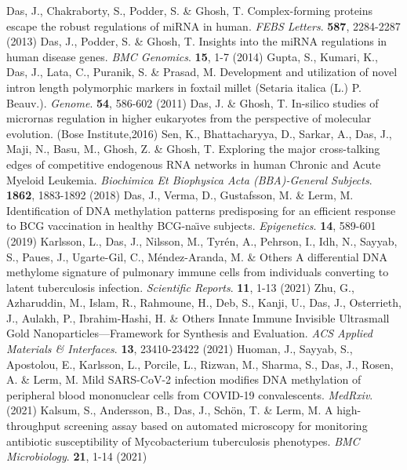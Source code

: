 Das, J., Chakraborty, S., Podder, S. \& Ghosh, T. Complex-forming proteins escape the robust regulations of miRNA in human. {\em FEBS Letters}. \textbf{587}, 2284-2287 (2013)
Das, J., Podder, S. \& Ghosh, T. Insights into the miRNA regulations in human disease genes. {\em BMC Genomics}. \textbf{15}, 1-7 (2014)
Gupta, S., Kumari, K., Das, J., Lata, C., Puranik, S. \& Prasad, M. Development and utilization of novel intron length polymorphic markers in foxtail millet (Setaria italica (L.) P. Beauv.). {\em Genome}. \textbf{54}, 586-602 (2011)
Das, J. \& Ghosh, T. In-silico studies of micrornas regulation in higher eukaryotes from the perspective of molecular evolution. (Bose Institute,2016)
Sen, K., Bhattacharyya, D., Sarkar, A., Das, J., Maji, N., Basu, M., Ghosh, Z. \& Ghosh, T. Exploring the major cross-talking edges of competitive endogenous RNA networks in human Chronic and Acute Myeloid Leukemia. {\em Biochimica Et Biophysica Acta (BBA)-General Subjects}. \textbf{1862}, 1883-1892 (2018)
Das, J., Verma, D., Gustafsson, M. \& Lerm, M. Identification of DNA methylation patterns predisposing for an efficient response to BCG vaccination in healthy BCG-naı̈ve subjects. {\em Epigenetics}. \textbf{14}, 589-601 (2019)
Karlsson, L., Das, J., Nilsson, M., Tyrén, A., Pehrson, I., Idh, N., Sayyab, S., Paues, J., Ugarte-Gil, C., Méndez-Aranda, M. \& Others A differential DNA methylome signature of pulmonary immune cells from individuals converting to latent tuberculosis infection. {\em Scientific Reports}. \textbf{11}, 1-13 (2021)
Zhu, G., Azharuddin, M., Islam, R., Rahmoune, H., Deb, S., Kanji, U., Das, J., Osterrieth, J., Aulakh, P., Ibrahim-Hashi, H. \& Others Innate Immune Invisible Ultrasmall Gold Nanoparticles—Framework for Synthesis and Evaluation. {\em ACS Applied Materials & Interfaces}. \textbf{13}, 23410-23422 (2021)
Huoman, J., Sayyab, S., Apostolou, E., Karlsson, L., Porcile, L., Rizwan, M., Sharma, S., Das, J., Rosen, A. \& Lerm, M. Mild SARS-CoV-2 infection modifies DNA methylation of peripheral blood mononuclear cells from COVID-19 convalescents. {\em MedRxiv}. (2021)
Kalsum, S., Andersson, B., Das, J., Schön, T. \& Lerm, M. A high-throughput screening assay based on automated microscopy for monitoring antibiotic susceptibility of Mycobacterium tuberculosis phenotypes. {\em BMC Microbiology}. \textbf{21}, 1-14 (2021)
